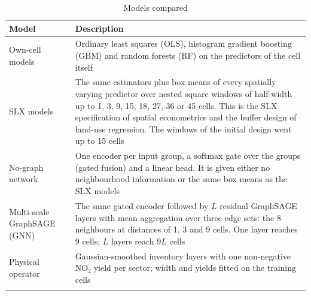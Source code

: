 \documentclass[pdflatex,sn-basic]{sn-jnl}
\begin{document}
\begin{table}[!htbp]
\caption{Models compared}\label{tab:models}
\footnotesize
\begin{tabularx}{\linewidth}{@{}L{2.2cm}Y{1}@{}}
\toprule
Model & Description \\
\midrule
Own-cell models & Ordinary least squares (OLS), histogram gradient boosting (GBM) and random forests (RF) on the predictors of the cell itself \\
SLX models & The same estimators plus box means of every spatially varying predictor over nested square windows of half-width up to 1, 3, 9, 15, 18, 27, 36 or 45 cells. This is the SLX specification of spatial econometrics and the buffer design of land-use regression. The windows of the initial design went up to 15 cells \\
No-graph network & One encoder per input group, a softmax gate over the groups (gated fusion) and a linear head. It is given either no neighbourhood information or the same box means as the SLX models \\
Multi-scale GraphSAGE (GNN) & The same gated encoder followed by $L$ residual GraphSAGE layers \citep{hamilton2017} with mean aggregation over three edge sets: the 8 neighbours at distances of 1, 3 and 9 cells. One layer reaches 9 cells; $L$ layers reach $9L$ cells \\
Physical operator & Gaussian-smoothed inventory layers with one non-negative NO₂ yield per sector; width and yields fitted on the training cells \\
\botrule
\end{tabularx}
\end{table}
\end{document}
